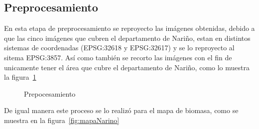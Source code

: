 \subsection{Preprocesamiento}

En esta etapa de preprocesamiento se reproyecto las imágenes obtenidas, debido a que las cinco imágenes
que cubren el departamento de Nariño, estan en distintos sistemas de coordenadas (EPSG:32618 y EPSG:32617) y se 
lo reproyecto al sitema EPSG:3857. Así como también se recorto las imágenes con el fin de unicamente tener 
el área que cubre el departamento de Nariño, como lo muestra la figura~\ref{fig:cuts}

\begin{figure}
  \centering
  \vfill
  \caption{Prepocesamiento}
  \label{fig:cuts}
\end{figure}

De igual manera este proceso se lo realizó para el mapa de biomasa, como se muestra en la figura~\ref{fig:mapaNarino}


